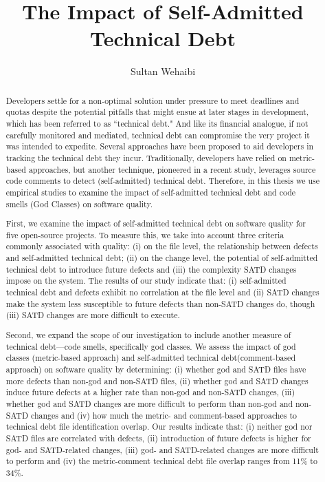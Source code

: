 \documentclass[12pt]{report}
\author{Sultan Wehaibi}
\title {The Impact of Self-Admitted Technical Debt}
\newcommand{\SATD}{self-admitted technical debt\xspace}
\begin{document}
\begin{abstract}
	
	

Developers settle for a non-optimal solution under pressure to meet deadlines and quotas despite the potential pitfalls that might ensue at later stages in development, which has been referred to as ``technical debt." And like its financial analogue, if not carefully monitored and mediated, technical debt can compromise the very project it was intended to expedite. Several approaches have been proposed to aid developers in tracking the technical debt they incur. Traditionally, developers have relied on metric-based approaches, but another technique, pioneered in a recent study, leverages source code comments to detect (self-admitted) technical debt. Therefore, in this thesis we use empirical studies to examine the impact of self-admitted technical debt and code smells (God Classes) on software quality.

First, we examine the impact of \SATD on software quality for five open-source projects. To measure this, we take into account three criteria commonly associated with quality: (i) on the file level, the relationship between defects and \SATD; (ii) on the change level, the potential of \SATD to introduce future defects and (iii) the complexity SATD changes impose on the system. The results of our study indicate that: (i) \SATD and defects exhibit no correlation at the file level and (ii) SATD changes make the system less susceptible to future defects than non-SATD changes do, though (iii) SATD changes are more difficult to execute.

Second, we expand the scope of our investigation to include another measure of technical debt---code smells, specifically god classes. We assess the impact of god classes (metric-based approach) and \SATD (comment-based approach) on software quality by determining: (i) whether god and SATD files have more defects than non-god and non-SATD files, (ii) whether god and SATD changes induce future defects at a higher rate than non-god and non-SATD changes, (iii) whether god and SATD changes are more difficult to perform than non-god and non-SATD changes and (iv) how much the metric- and comment-based approaches to technical debt file identification overlap. Our results indicate that: (i) neither god nor SATD files are correlated with defects, (ii) introduction of future defects is higher for god- and SATD-related changes, (iii) god- and SATD-related changes are more difficult to perform and (iv) the metric-comment technical debt file overlap ranges from 11\% to 34\%.


\end{abstract}
\end{document}
